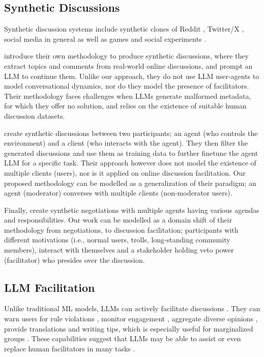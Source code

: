 \subsection{Synthetic Discussions}
\label{ssec:related:discussions}

Synthetic discussion systems include synthetic clones of Reddit \cite{park_simulacra}, Twitter/X \cite{mou_2024}, social media in general \cite{tornberg_2023, y_social} as well as games \cite{Park2023GenerativeAI} and social experiments \cite{zhou_2024_sotopia}.

\citet{balog_2024} introduce their own methodology to produce synthetic discussions, where they extract topics and comments from real-world online discussions, and prompt an \ac{LLM} to continue them. Unlike our approach, they do not use \ac{LLM} user-agents to model conversational dynamics, nor do they model the presence of facilitators. Their methodology faces challenges when \acp{LLM} generate malformed metadata, for which they offer no solution, and relies on the existence of suitable human discussion datasets.

\citet{ulmer2024} create synthetic discussions between two participants; an agent (who controls the environment) and a client (who interacts with the agent). They then filter the generated discussions and use them as training data to further finetune the agent \ac{LLM} for a specific task. Their approach however does not model the existence of multiple clients (users), nor is it applied on online discussion facilitation. Our proposed methodology can be modelled as a generalization of their paradigm; an agent (moderator) converses with multiple clients (non-moderator users).

Finally, \citet{abdelnabi_negotiations} create synthetic negotiations with multiple agents having various agendas and responsibilities. Our work can be modelled as a domain shift of their methodology from negotiations, to discussion facilitation; participants with different motivations (i.e., normal users, trolls, long-standing community members), interact with themselves and a stakeholder holding veto power (facilitator) who presides over the discussion.


\subsection{LLM Facilitation}

Unlike traditional \ac{ML} models, \acp{LLM} can actively facilitate discussions \cite{korre2025evaluation}. They can warn users for rule violations \cite{Kumar_AbuHashem_Durumeric_2024}, monitor engagement \cite{schroeder-etal-2024-fora}, aggregate diverse opinions \cite{small-polis-llm}, provide translations and writing tips, which is especially useful for marginalized groups \cite{Tsai2024Generative}. These capabilities suggest that \acp{LLM} may be able to assist or even replace human facilitators in many tasks \cite{seering_self_moderation}.

